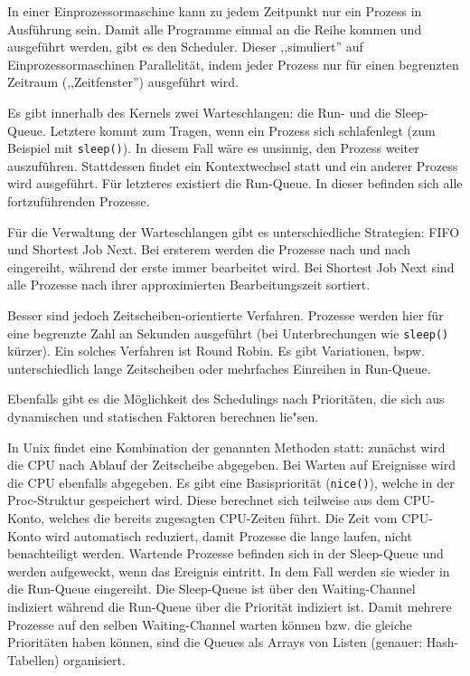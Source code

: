 \begin{answer}
  In einer Einprozessormaschine kann zu jedem Zeitpunkt nur ein Prozess in Ausführung sein.
  Damit alle Programme einmal an die Reihe kommen und ausgeführt werden, gibt es den Scheduler.
  Dieser ,,simuliert'' auf Einprozessormaschinen Parallelität, indem jeder Prozess nur für
  einen begrenzten Zeitraum (,,Zeitfenster'') ausgeführt wird.

  Es gibt innerhalb des Kernels zwei Warteschlangen: die Run- und die Sleep-Queue.
  Letztere kommt zum Tragen, wenn ein Prozess sich schlafenlegt (zum Beispiel mit \texttt{sleep()}).
  In diesem Fall wäre es unsinnig, den Prozess weiter auszuführen. Stattdessen findet ein Kontextwechsel
  statt und ein anderer Prozess wird ausgeführt. Für letzteres existiert die Run-Queue. In dieser befinden
  sich alle fortzuführenden Prozesse.

  Für die Verwaltung der Warteschlangen gibt es unterschiedliche Strategien: FIFO und Shortest Job Next.
  Bei ersterem werden die Prozesse nach und nach eingereiht, während der erste immer bearbeitet wird.
  Bei Shortest Job Next sind alle Prozesse nach ihrer approximierten Bearbeitungszeit sortiert.

  Besser sind jedoch Zeitscheiben-orientierte Verfahren. Prozesse werden hier für eine begrenzte
  Zahl an Sekunden ausgeführt (bei Unterbrechungen wie \texttt{sleep()} kürzer). Ein solches Verfahren ist Round Robin.
  Es gibt Variationen, bspw. unterschiedlich lange Zeitscheiben oder mehrfaches Einreihen in Run-Queue.

  Ebenfalls gibt es die Möglichkeit des Schedulings nach Prioritäten, die sich aus dynamischen und statischen
  Faktoren berechnen lie"sen.
\end{answer}

\begin{answer}
  In Unix findet eine Kombination der genannten Methoden statt: zunächst wird die CPU nach Ablauf der Zeitscheibe abgegeben. Bei Warten auf Ereignisse wird die CPU ebenfalls abgegeben. Es gibt eine Basispriorität (\texttt{nice()}), welche in der Proc-Struktur gespeichert wird.
  Diese berechnet sich teilweise aus dem CPU-Konto, welches die bereits zugesagten CPU-Zeiten führt.
  Die Zeit vom CPU-Konto wird automatisch reduziert, damit Prozesse die lange laufen, nicht benachteiligt werden.
  Wartende Prozesse befinden sich in der Sleep-Queue und werden aufgeweckt, wenn das Ereignis eintritt. In dem Fall werden sie wieder in die Run-Queue eingereiht.
  Die Sleep-Queue ist über den Waiting-Channel indiziert während die Run-Queue über die Priorität indiziert ist.
  Damit mehrere Prozesse auf den selben Waiting-Channel warten können bzw. die gleiche Prioritäten haben können,
  sind die Queues als Arrays von Listen (genauer: Hash-Tabellen) organisiert.
\end{answer}

